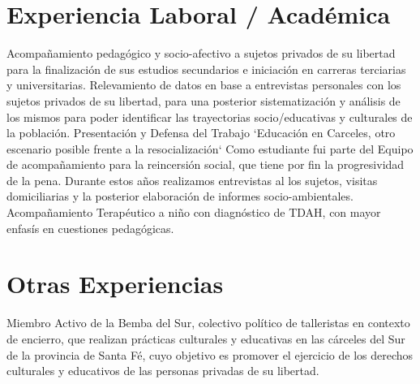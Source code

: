 \documentclass[11pt,a4paper,sans]{moderncv}        %
\begin{document}
\section{Experiencia Laboral / Acad\'emica}
  {
    Acompañamiento pedagógico y socio-afectivo a sujetos privados de su libertad para la finalización de sus estudios secundarios e iniciación en carreras terciarias y universitarias.
  }
\vspace{3mm}
  {
    Relevamiento de datos en base a entrevistas personales con los sujetos privados de su libertad, para una posterior sistematización y análisis de los mismos para poder identificar las trayectorias socio/educativas y culturales de la población.  
  }
\vspace{3mm}
  {
    Presentación y Defensa del Trabajo `Educación en Carceles, otro escenario posible frente a la resocialización`
  }
\vspace{3mm}
  {
    Como estudiante fui parte del Equipo de acompañamiento para la reincersión social, que tiene por fin la progresividad de la pena. Durante estos años realizamos entrevistas al los sujetos, visitas domiciliarias y la posterior elaboración de informes socio-ambientales.
  }
\vspace{3mm}
  {
    Acompañamiento Terap\'eutico a niño con diagnóstico de TDAH, con mayor enfasís en cuestiones pedagógicas.  
  }
\vspace{2mm}

\section{Otras Experiencias}
  {
    Miembro Activo de la Bemba del Sur, colectivo político de talleristas en contexto de encierro, que realizan prácticas culturales y educativas en las cárceles del Sur de la provincia de Santa Fé, cuyo objetivo es promover el ejercicio de los derechos culturales y educativos de las personas privadas de su libertad.
  }
\end{document}
